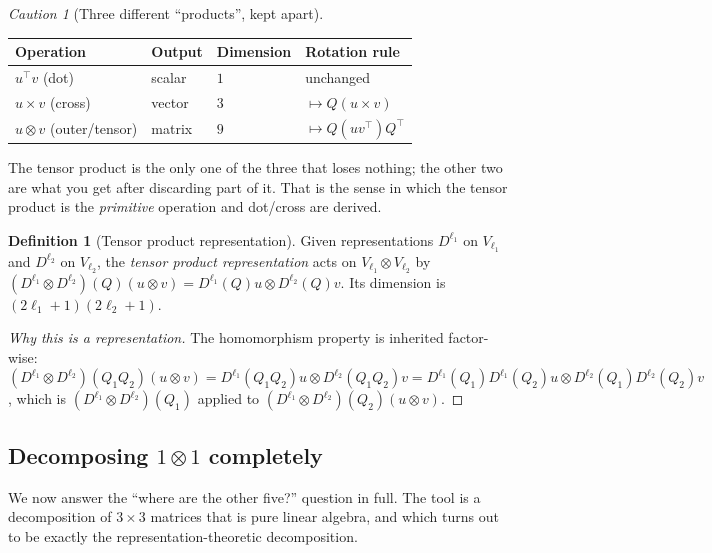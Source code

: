 \documentclass[11pt,a4paper]{report}
\theoremstyle{definition}
\newtheorem{definition}[definition]{Definition}
\theoremstyle{remark}
\newtheorem{caution}[caution]{Caution}
\begin{document}
\begin{caution}[Three different ``products'', kept apart]
\label{caution:three-products}
\begin{center}
\begin{tabular}{llll}
\toprule
Operation & Output & Dimension & Rotation rule \\
\midrule
$u^\top v$ (dot) & scalar & $1$ & unchanged \\
$u\times v$ (cross) & vector & $3$ & $\mapsto Q(u\times v)$ \\
$u\otimes v$ (outer/tensor) & matrix & $9$ & $\mapsto Q(uv^\top)Q^\top$ \\
\bottomrule
\end{tabular}
\end{center}
The tensor product is the only one of the three that loses nothing; the
other two are what you get after discarding part of it. That is the sense in
which the tensor product is the \emph{primitive} operation and dot/cross are
derived.
\end{caution}

\begin{definition}[Tensor product representation]
\label{def:tensor-product-rep}
Given representations $D^{\ell_1}$ on $V_{\ell_1}$ and $D^{\ell_2}$ on
$V_{\ell_2}$, the \emph{tensor product representation} acts on
$V_{\ell_1}\otimes V_{\ell_2}$ by $(D^{\ell_1}\otimes D^{\ell_2})(Q)(u\otimes v) = D^{\ell_1}(Q)u\otimes D^{\ell_2}(Q)v$.
Its dimension is $(2\ell_1+1)(2\ell_2+1)$.
\end{definition}

\begin{proof}[Why this is a representation]
The homomorphism property is inherited factor-wise:
$(D^{\ell_1}\otimes D^{\ell_2})(Q_1Q_2)(u\otimes v)
= D^{\ell_1}(Q_1Q_2)u\otimes D^{\ell_2}(Q_1Q_2)v
= D^{\ell_1}(Q_1)D^{\ell_1}(Q_2)u\otimes D^{\ell_2}(Q_1)D^{\ell_2}(Q_2)v$,
which is $(D^{\ell_1}\otimes D^{\ell_2})(Q_1)$ applied to
$(D^{\ell_1}\otimes D^{\ell_2})(Q_2)(u\otimes v)$.
\end{proof}

\subsection{Decomposing \texorpdfstring{$1\otimes1$}{1x1} completely}
\label{sec:one-tensor-one}

We now answer the ``where are the other five?'' question in full. The tool
is a decomposition of $3\times3$ matrices that is pure linear algebra, and
which turns out to be exactly the representation-theoretic decomposition.
\end{document}
